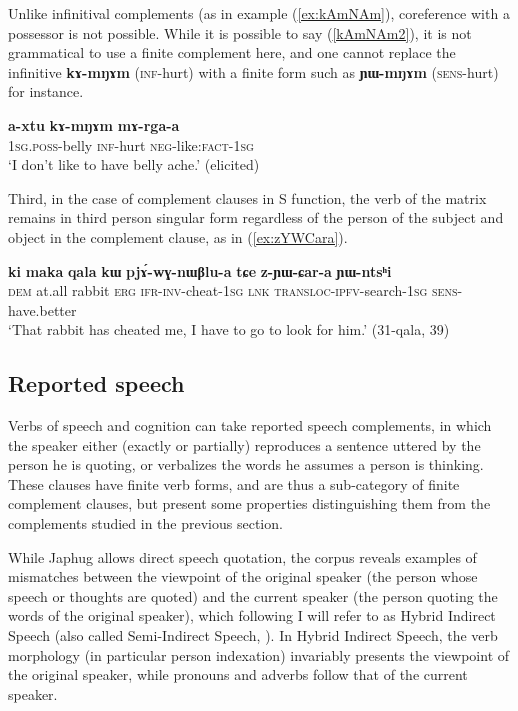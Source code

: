 \documentclass[oneside,a4paper,11pt]{article}
\newcommand{\ipa}[1]{\textbf{\phon#1}} %
\begin{document}
Unlike infinitival complements (as in example (\ref{ex:kAmNAm}), coreference with a possessor is not possible. While it is possible to say (\ref{kAmNAm2}), it is not grammatical to use a finite complement here, and one cannot replace the infinitive \ipa{kɤ-mŋɤm} (\textsc{inf}-hurt) with a finite form such as \ipa{ɲɯ-mŋɤm} (\textsc{sens}-hurt) for instance.

\begin{exe}
\ex \label{kAmNAm2}
\gll \ipa{a-xtu} \ipa{kɤ-mŋɤm} \ipa{mɤ-rga-a} \\
\textsc{1sg.poss}-belly \textsc{inf}-hurt \textsc{neg}-like:\textsc{fact-1sg} \\
\glt `I don't like to have belly ache.' (elicited)
\end{exe}

Third, in the case of complement clauses in S function, the verb of the matrix remains in third person singular form regardless of the person of the subject and object in the complement clause, as in (\ref{ex:zYWCara}).

\begin{exe}
\ex \label{ex:zYWCara}
\gll \ipa{ki} 	\ipa{maka} 	\ipa{qala} 	\ipa{kɯ} 	\ipa{pjɤ́-wɣ-nɯβlu-a} 	\ipa{tɕe} 	\ipa{z-ɲɯ-ɕar-a} 	\ipa{ɲɯ-ntsʰi}\\ 
\textsc{dem} at.all rabbit \textsc{erg} \textsc{ifr-inv}-cheat-\textsc{1sg} \textsc{lnk} \textsc{transloc-ipfv}-search-\textsc{1sg} \textsc{sens}-have.better \\
\glt `That rabbit has cheated me, I have to go to look for him.' (31-qala, 39)
\end{exe}

\subsection{Reported speech}
Verbs of speech and cognition can take reported speech complements, in which the speaker either (exactly or partially) reproduces a sentence uttered by the person he is quoting, or verbalizes the words he assumes a person is thinking. These clauses have finite verb forms, and are thus a sub-category of finite complement clauses, but present some properties distinguishing them from the complements studied in the previous section.

While Japhug allows direct speech quotation, the corpus reveals examples of mismatches between the viewpoint of the original speaker (the person whose speech or thoughts are quoted) and the current speaker (the person quoting the words of the original speaker), which following \citet{tournadre08conjunct} I will refer to as Hybrid Indirect Speech (also called Semi-Indirect Speech, \citet{aikhenvald08semidirect}). In Hybrid Indirect Speech, the verb morphology (in particular person indexation) invariably presents the viewpoint of the original speaker, while pronouns and adverbs follow that of the current speaker.
\end{document}
